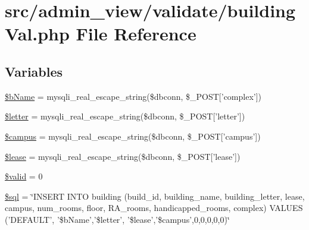 \hypertarget{buildingVal_8php}{\section{src/admin\-\_\-view/validate/building\-Val.php \-File \-Reference}
\label{buildingVal_8php}
}
\subsection*{\-Variables}
\begin{DoxyCompactItemize}
\item 
\hyperlink{buildingVal_8php_adda32c78f7f7aed9a0f7bb03a9198e9c}{\$b\-Name} = mysqli\-\_\-real\-\_\-escape\-\_\-string(\$dbconn, \$\-\_\-\-P\-O\-S\-T\mbox{[}'complex'\mbox{]})
\item 
\hyperlink{buildingVal_8php_a5f9c1e96bbb9e8e9cbb49a18f0412f58}{\$letter} = mysqli\-\_\-real\-\_\-escape\-\_\-string(\$dbconn, \$\-\_\-\-P\-O\-S\-T\mbox{[}'letter'\mbox{]})
\item 
\hyperlink{buildingVal_8php_a6f0655994f3941d6ab50f681032f899b}{\$campus} = mysqli\-\_\-real\-\_\-escape\-\_\-string(\$dbconn, \$\-\_\-\-P\-O\-S\-T\mbox{[}'campus'\mbox{]})
\item 
\hyperlink{buildingVal_8php_ae95126b1133cf958aaf8a31b0283364c}{\$lease} = mysqli\-\_\-real\-\_\-escape\-\_\-string(\$dbconn, \$\-\_\-\-P\-O\-S\-T\mbox{[}'lease'\mbox{]})
\item 
\hyperlink{buildingVal_8php_a0587674d27d00ef497e08e53ccf45bbb}{\$valid} = 0
\item 
\hyperlink{buildingVal_8php_a047170d6020a882807665812a27e2525}{\$sql} = \char`\"{}\-I\-N\-S\-E\-R\-T \-I\-N\-T\-O building (build\-\_\-id, building\-\_\-name, building\-\_\-letter, lease, campus, num\-\_\-rooms, floor, \-R\-A\-\_\-rooms, handicapped\-\_\-rooms, complex) \-V\-A\-L\-U\-E\-S ('\-D\-E\-F\-A\-U\-L\-T', '\$b\-Name','\$letter', '\$lease','\$campus',0,0,0,0,0)\char`\"{}
\end{DoxyCompactItemize}



